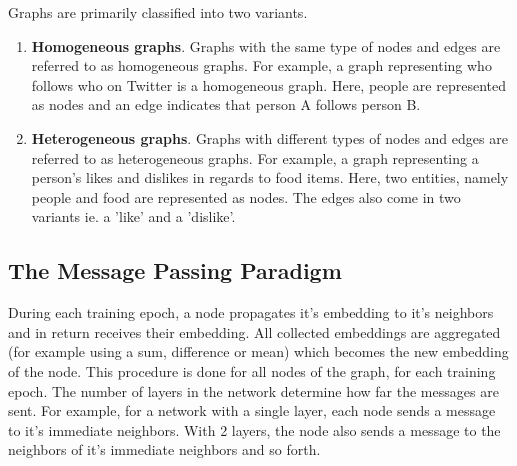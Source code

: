 Graphs are primarily classified into two variants.

\begin{enumerate}
\item \textbf{Homogeneous graphs}. Graphs with the same type of nodes
  and edges are referred to as homogeneous graphs. For example, a
  graph representing who follows who on Twitter is a homogeneous
  graph. Here, people are represented as nodes and an edge indicates
  that person A follows person B.
\item \textbf{Heterogeneous graphs}. Graphs with different types of
  nodes and edges are referred to as heterogeneous graphs. For
  example, a graph representing a person's likes and dislikes in
  regards to food items. Here, two entities, namely people and food
  are represented as nodes. The edges also come in two variants ie. a
  'like' and a 'dislike'.
\end{enumerate}

\subsection{The Message Passing Paradigm}

During each training epoch, a node propagates it's embedding to it's
neighbors and in return receives their embedding. All collected
embeddings are aggregated (for example using a sum, difference or
mean) which becomes the new embedding of the node. This procedure is
done for all nodes of the graph, for each training epoch. The number
of layers in the network determine how far the messages are sent. For
example, for a network with a single layer, each node sends a message
to it's immediate neighbors. With 2 layers, the node also sends a
message to the neighbors of it's immediate neighbors and so forth.





